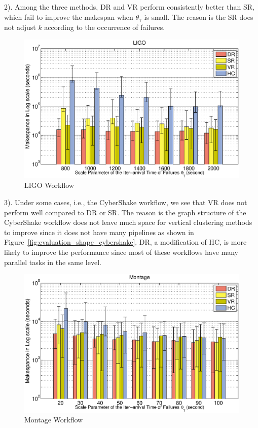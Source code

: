 \documentclass{IOS-Book-Article}
\begin{document}
2). Among the three methods, DR and VR perform consistently better than SR, which fail to improve the makespan when $\theta_{\gamma}$ is small. The reason is the SR does not adjust $k$ according to the occurrence of failures. 

\begin{figure}[!htb]
\centering
  \includegraphics[width=1\linewidth]{ligo.eps}
  \caption{LIGO Workflow}
  \label{fig:expr_ligo}
\end{figure}

3). Under some cases, i.e., the CyberShake workflow, we see that VR does not perform well compared to DR or SR. The reason is the graph structure of the CyberShake workflow does not leave much space for vertical clustering methods to improve since it does not have many pipelines as shown in Figure~\ref{fig:evaluation_shape_cybershake}. DR, a modification of HC, is more likely to improve the performance since most of these workflows have many parallel tasks in the same level. 



\begin{figure}[!htb]
\centering
  \includegraphics[width=1\linewidth]{montage.eps}
  \caption{Montage Workflow}
  \label{fig:expr_montage}
\end{figure}
\end{document}
